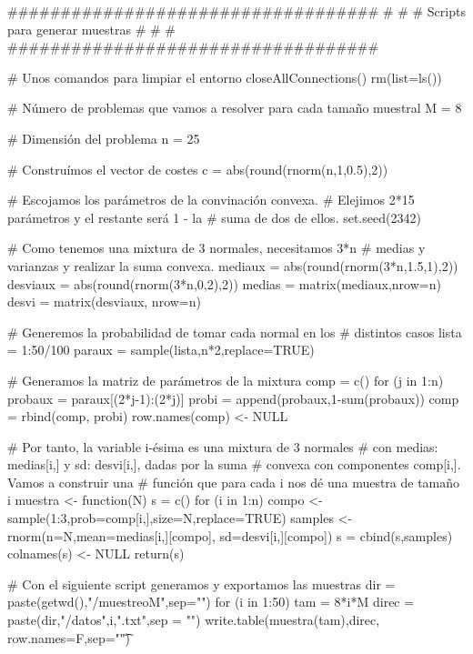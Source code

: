 \documentclass[twoside,a4paper,openright,12pt]{book}
\begin{document}
\begin{erre}
###################################
#                                 #
#  Scripts para generar muestras  #
#                                 #
###################################

# Unos comandos para limpiar el entorno
closeAllConnections()
rm(list=ls())

# Número de problemas que vamos a resolver para cada tamaño muestral
M = 8

# Dimensión del problema
n = 25

# Construímos el vector de costes
c = abs(round(rnorm(n,1,0.5),2))

# Escojamos los parámetros de la convinación convexa.
# Elejimos 2*15 parámetros y el restante será 1 - la 
# suma de dos de ellos.
set.seed(2342)

# Como tenemos una mixtura de 3 normales, necesitamos 3*n
# medias y varianzas y realizar la suma convexa.
mediaux = abs(round(rnorm(3*n,1.5,1),2))
desviaux = abs(round(rnorm(3*n,0,2),2))
medias = matrix(mediaux,nrow=n)
desvi = matrix(desviaux, nrow=n)

# Generemos la probabilidad de tomar cada normal en los
# distintos casos
lista = 1:50/100
paraux = sample(lista,n*2,replace=TRUE)

# Generamos la matriz de parámetros de la mixtura
comp = c()
for (j in 1:n) {
  probaux = paraux[(2*j-1):(2*j)]
  probi = append(probaux,1-sum(probaux))
  comp = rbind(comp, probi)
}
row.names(comp) <- NULL

# Por tanto, la variable i-ésima es una mixtura de 3 normales 
# con medias: medias[i,] y sd: desvi[i,], dadas por la suma 
# convexa con componentes comp[i,]. Vamos a construir una 
# función que para cada i nos dé una muestra de tamaño i
muestra <- function(N){
  s = c()
  for (i in 1:n){
    compo <- sample(1:3,prob=comp[i,],size=N,replace=TRUE)
    samples <- rnorm(n=N,mean=medias[i,][compo],
                     sd=desvi[i,][compo])
    s = cbind(s,samples)  }
  colnames(s) <- NULL
  return(s)}

# Con el siguiente script generamos y exportamos las muestras
dir = paste(getwd(),"/muestreoM",sep="")
for (i in 1:50) {
  tam = 8*i*M
  direc = paste(dir,"/datos",i,".txt",sep = "")
  write.table(muestra(tam),direc, row.names=F,sep="\t")
  }
\end{erre}


\end{document}
